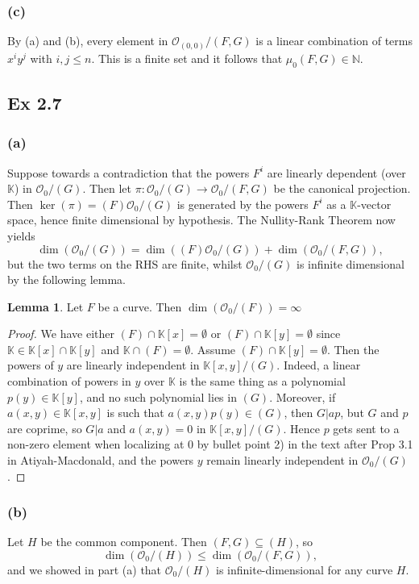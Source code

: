 \documentclass{article}
\theoremstyle{definition}
\newtheorem{lemma}[theorem]{Lemma}
\newcommand{\K}{\mathbb{K}}
\newcommand{\N}{\mathbb{N}}
\newcommand{\Kxy}{\K[x, y]}
\begin{document}
\subsubsection*{(c)}

By (a) and (b), every element in $\mathcal{O}_{(0, 0)}/(F, G)$ is a linear
combination of terms $x^{i}y^{j}$ with $i, j \leq n$. This is a finite set and
it follows that $\mu_{0}(F, G) \in \N$.

\subsection*{Ex 2.7}

\subsubsection*{(a)}

Suppose towards a contradiction that the powers $F^{i}$ are linearly dependent
(over $\K$) in $\mathcal{O}_0 / (G)$. Then let $\pi : \mathcal{O}_0/(G) \to
\mathcal{O}_0/(F, G)$ be the canonical projection. Then $\ker(\pi) =
(F)\mathcal{O}_0/(G)$ is generated by the powers $F^{i}$ as a $\K$-vector
space, hence finite dimensional by hypothesis. The Nullity-Rank Theorem now
yields 
\[
	\dim \left(\mathcal{O}_0 / (G)\right) 
	= 
	\dim \left((F)\mathcal{O}_0/(G)\right) 
	+ 
	\dim \left(\mathcal{O}_0/(F, G)\right),
\] 
but the two terms on the RHS are finite, whilst $\mathcal{O}_0 / (G)$ is
infinite dimensional by the following lemma. 


\begin{lemma}
	Let $F$ be a curve. Then $\dim \left(\mathcal{O}_0 / (F)\right) = \infty$
\end{lemma} 
\begin{proof}

	We have either $(F) \cap \K[x] = \emptyset$ or $(F) \cap \K[y] = \emptyset$
	since $\K \in \K[x] \cap \K[y]$ and $\K \cap (F) = \emptyset$. Assume $(F)
	\cap \K[y] = \emptyset$. Then the powers of $y$ are linearly independent in
	$\Kxy / (G)$. Indeed, a linear combination of powers in $y$ over $\K$ is
	the same thing as a polynomial $p(y) \in \K[y]$, and no such polynomial
	lies in $(G)$. Moreover, if $a(x, y) \in \Kxy$ is such that $a(x, y)p(y)
	\in (G)$, then $G | ap$, but $G$ and $p$ are coprime, so $G | a$ and $a(x,
	y) = 0$ in $\Kxy/(G)$. Hence $p$ gets sent to a non-zero element when
	localizing at $0$ by bullet point 2) in the text after Prop 3.1 in
	Atiyah-Macdonald, and the powers $y$ remain linearly independent in
	$\mathcal{O}_0/(G)$. 

\end{proof}



\subsubsection*{(b)}

Let $H$ be the common component. Then $(F, G) \subseteq (H)$, so
\[
	\dim \left(\mathcal{O}_0/(H)\right) \leq \dim \left(\mathcal{O}_0/(F, G)\right),
\] 
and we showed in part (a) that $\mathcal{O}_0/(H)$ is infinite-dimensional for
any curve $H$.
\end{document}
